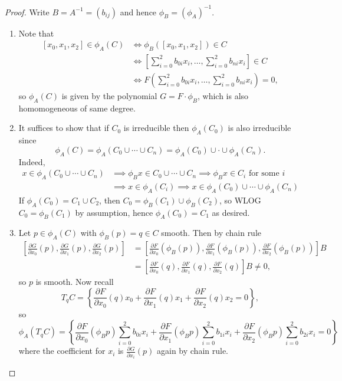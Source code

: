 \documentclass{article}
\theoremstyle{definition}
\begin{document}
\begin{proof}
Write $B=A^{-1}=(b_{ij})$ and hence $\phi_B=(\phi_A)^{-1}$.
\begin{enumerate}
\item Note that
\[
\begin{aligned}
[x_0,x_1,x_2]\in\phi_A(C) &\iff \phi_B([x_0,x_1,x_2])\in C \\
&\iff \left[\sum_{i=0}^2 b_{0i}x_i,\ldots,\sum_{i=0}^2b_{ni}x_i\right]\in C \\
&\iff F\left(\sum_{i=0}^2 b_{0i}x_i,\ldots,\sum_{i=0}^2b_{ni}x_i\right)=0,
\end{aligned}
\]
so $\phi_A(C)$ is given by the polynomial $G=F\cdot\phi_B$, which is also homomogeneous of same degree.
\item It suffices to show that if $C_0$ is irreducible then $\phi_A(C_0)$ is also irreducible since
\[
\phi_A(C)=\phi_A(C_0\cup\cdots\cup C_n)=\phi_A(C_0)\cup\cdot\cup\phi_A(C_n).
\]
Indeed,
\[
\begin{aligned}
x\in \phi_A(C_0\cup\cdots\cup C_n) &\implies \phi_B x\in C_0\cup\cdots\cup C_n \implies \phi_B x\in C_i\text{ for some }i\\
&\implies x\in \phi_A(C_i)\implies x\in\phi_A(C_0)\cup\cdots\cup\phi_A(C_n)
\end{aligned}
\]
If $\phi_A(C_0)=C_1\cup C_2$, then $C_0=\phi_B(C_1)\cup\phi_B(C_2)$, so WLOG $C_0=\phi_B(C_1)$ by assumption, hence $\phi_A(C_0)=C_1$ as desired.
\item Let $p\in\phi_A(C)$ with $\phi_B(p)=q\in C$ smooth. Then by chain rule
\[
\begin{aligned}
\left[\frac{\partial G}{\partial x_0}(p),\frac{\partial G}{\partial x_1}(p),\frac{\partial G}{\partial x_2}(p)\right]&=\left[\frac{\partial F}{\partial x_0}(\phi_B(p)),\frac{\partial F}{\partial x_1}(\phi_B(p)),\frac{\partial F}{\partial x_2}(\phi_B(p))\right]B \\
&=\left[\frac{\partial F}{\partial x_0}(q),\frac{\partial F}{\partial x_1}(q),\frac{\partial F}{\partial x_2}(q)\right]B\neq 0,
\end{aligned}
\]
so $p$ is smooth. Now recall
\[
T_qC=\left\{\frac{\partial F}{\partial x_0}(q)x_0+\frac{\partial F}{\partial x_1}(q)x_1+\frac{\partial F}{\partial x_2}(q)x_2=0\right\},
\]
so
\[
\phi_A(T_qC)=\left\{\frac{\partial F}{\partial x_0}(\phi_Bp)\sum_{i=0}^2 b_{0i}x_i+\frac{\partial F}{\partial x_1}(\phi_Bp)\sum_{i=0}^2 b_{1i}x_i+\frac{\partial F}{\partial x_2}(\phi_Bp)\sum_{i=0}^2 b_{2i}x_i=0\right\}
\]
where the coefficient for $x_i$ is $\frac{\partial G}{\partial x_i}(p)$ again by chain rule.
\end{enumerate}
\end{proof}
\end{document}

